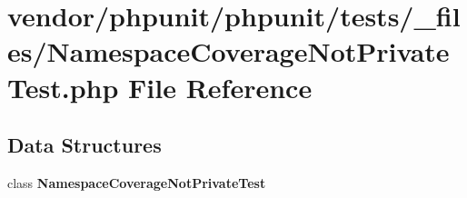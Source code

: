 \section{vendor/phpunit/phpunit/tests/\+\_\+files/\+Namespace\+Coverage\+Not\+Private\+Test.php File Reference}
\label{phpunit_2tests_2__files_2_namespace_coverage_not_private_test_8php}
\subsection*{Data Structures}
\begin{DoxyCompactItemize}
\item 
class {\bf Namespace\+Coverage\+Not\+Private\+Test}
\end{DoxyCompactItemize}

